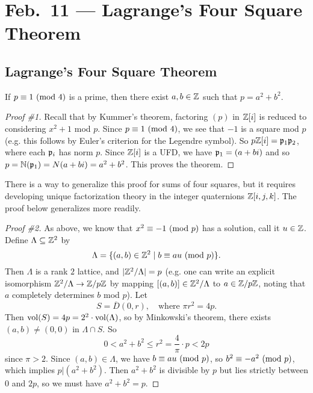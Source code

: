 \chapter{Feb.~11 --- Lagrange's Four Square Theorem}

\section{Lagrange's Four Square Theorem}
\begin{theorem}[Fermat]
  If $p \equiv 1 \ (\mathrm{mod}\ 4)$ is a prime, then
  there exist $a, b \in \mathbb{Z}$ such that $p = a^2 + b^2$.
\end{theorem}

\begin{proof}[Proof \#1]
  Recall that by Kummer's theorem, factoring
  $(p)$ in $\mathbb{Z}[i]$ is reduced to considering
  $x^2 + 1$ mod $p$. Since $p \equiv 1 \ (\mathrm{mod}\ 4)$,
  we see that $-1$ is a square mod $p$ (e.g. this follows
  by Euler's criterion for the Legendre symbol).
  So $p\mathbb{Z}[i] = \mathfrak{p}_1 \mathfrak{p}_2$, where each $\mathfrak{p}_i$ has norm $p$.
  Since $\mathbb{Z}[i]$ is a UFD, we have $\mathfrak{p}_1 = (a + bi)$
  and so $p = \mathbb{N}(\mathfrak{p}_1) = N(a + bi) = a^2 + b^2$.
  This proves the theorem.
\end{proof}

\begin{remark}
  There is a way to generalize this proof for sums of
  four squares, but it requires developing unique factorization
  theory in the integer quaternions $\mathbb{Z}[i, j, k]$.
  The proof below generalizes more readily.
\end{remark}

\begin{proof}[Proof \#2]
  As above, we know that $x^2 \equiv -1 \ (\mathrm{mod}\ p)$
  has a solution, call it $u \in \mathbb{Z}$. Define $\Lambda \subseteq \mathbb{Z}^2$ by
  \[
    \Lambda = \{(a, b) \in \mathbb{Z}^2 \mid b \equiv au \ (\mathrm{mod}\ p)\}.
  \]
  Then $\Lambda$ is a rank $2$ lattice, and
  $|\mathbb{Z}^2 / \Lambda| = p$ (e.g. one can write an explicit
  isomorphism $\mathbb{Z}^2 / \Lambda \to \mathbb{Z} / p\mathbb{Z}$ by mapping
  $[(a, b)] \in \mathbb{Z}^2 / \Lambda$ to $a \in \mathbb{Z} / p\mathbb{Z}$, noting
  that $a$ completely determines $b$ mod $p$). Let
  \[
    S = \overline{D}(0, r), \quad \text{where } \pi r^2 = 4p.
  \]
  Then $\operatorname{vol}(S) = 4p = 2^2 \cdot \operatorname{vol}(\Lambda)$, so
  by Minkowski's theorem, there exists $(a, b) \ne (0, 0)$
  in $\Lambda \cap S$. So
  \[
    0 < a^2 + b^2 \le r^2 = \frac{4}{\pi} \cdot p < 2p
  \]
  since $\pi > 2$. Since $(a, b) \in \Lambda$, we have
  $b \equiv au \ (\mathrm{mod}\ p)$, so $b^2 \equiv -a^2 \ (\mathrm{mod}\ p)$,
  which implies $p | (a^2 + b^2)$. Then
  $a^2 + b^2$ is divisible by $p$ but lies strictly
  between $0$ and $2p$, so we must have $a^2 + b^2 = p$.
\end{proof}

